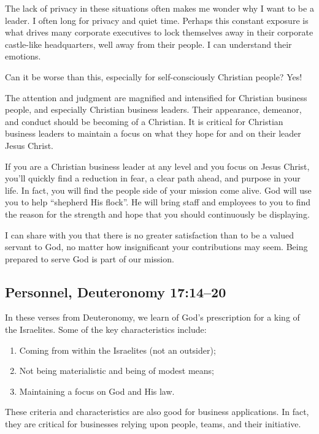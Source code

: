 \documentclass[12pt]{memoir}
\begin{document}
The lack of privacy in
these situations often makes me wonder why I want to be a leader.
I often long for privacy and quiet time. Perhaps this constant exposure
is what drives many corporate executives to lock themselves away in
their corporate castle-like headquarters, well away from their people.
I can understand their emotions.

Can it be worse than this, especially for self-consciously Christian people? Yes!

The attention and judgment are magnified and intensified for Christian business people, and especially Christian business leaders. Their appearance, demeanor, and conduct should be becoming of a Christian. It is critical
for Christian business leaders to maintain a focus on what they hope for and on their leader Jesus Christ. 



If you are a Christian business leader at any level and you focus
on Jesus Christ, you'll quickly find a reduction in fear, a clear
path ahead, and purpose in your life. In fact, you will find the people
side of your mission come alive. God will use you to help ``shepherd His flock''. He will bring staff and employees to you to find the reason for the strength and hope that you should continuously be displaying.

I can share with you that there is no greater satisfaction than to
be a valued servant to God, no matter how insignificant your contributions
may seem. Being prepared to serve God is part of our mission. 

\subsection[Personnel]{Personnel, Deuteronomy 17:14--20}

In these verses from Deuteronomy, we learn of God's prescription for a king of the Israelites. Some of the key characteristics include:
\begin{enumerate}
\item Coming from within the Israelites (not an outsider); 
\item Not being materialistic and being of modest means; 
\item Maintaining a focus on God and His law.
\end{enumerate}

These criteria and characteristics are also good for business applications.
In fact, they are critical for businesses relying upon people, teams, and their initiative. 
\end{document}
